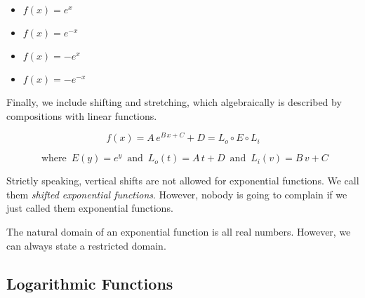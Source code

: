 \documentclass{ximera}
\begin{document}
\begin{template}
\begin{itemize}
\item $f(x) = e^x$ 
\item $f(x) = e^{-x}$ 
\item $f(x) = -e^x$ 
\item $f(x) = -e^{-x}$ 
\end{itemize}






Finally, we include shifting and stretching, which algebraically is described by compositions with linear functions.


\[ f(x) = A \, e^{B \, x + C} + D = L_o \circ E \circ L_i\]

\[
\text{ where } \,  E(y) = e^y   \,  \text{ and } \,   L_o(t) = A \, t + D    \,  \text{ and } \,   L_i(v) = B \, v + C
\]



Strictly speaking, vertical shifts are not allowed for exponential functions.  We call them \textit{shifted exponential functions}.  However, nobody is going to complain if we just called them exponential functions.






\end{template}





The natural domain of an exponential function is all real numbers.  However, we can always state a restricted domain. \\









\subsection*{Logarithmic Functions}
\end{document}
